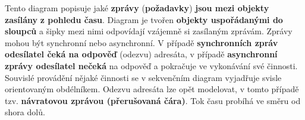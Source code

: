 Tento diagram popisuje jaké \textbf{zprávy} (\textbf{požadavky}) \textbf{jsou mezi objekty zasílány} \textbf{z pohledu času}. Diagram je tvořen \textbf{objekty uspořádanými do sloupců} a šipky mezi nimi odpovídají {vzájemně si zasílaným zprávám}. Zprávy mohou být {synchronní} nebo {asynchronní}. V případě \textbf{synchronních zpráv odesílatel čeká na odpověď} (odezvu) adresáta, v případě \textbf{asynchronní zprávy odesílatel nečeká} na odpověď a pokračuje ve vykonávání své činnosti. Souvislé provádění nějaké činnosti se v sekvenčním diagram vyjadřuje svisle orientovaným obdélníkem. Odezvu adresáta lze opět modelovat, v tomto případě tzv. \textbf{návratovou zprávou (přerušovaná čára)}. Tok času probíhá ve směru od shora dolů.
\\\\
\noindent{}

\pagebreak
